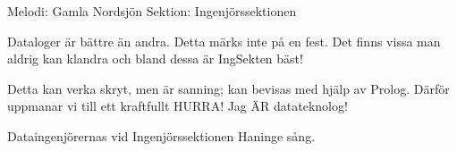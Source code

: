 \begin{song}

\begin{songmeta}
Melodi: Gamla Nordsjön
Sektion: Ingenjörssektionen
\end{songmeta}

\begin{songtext}
Dataloger är bättre än andra.
Detta märks inte på en fest.
Det finns vissa man aldrig kan klandra
och bland dessa är IngSekten bäst!

Detta kan verka skryt, men är sanning;
kan bevisas med hjälp av Prolog.
Därför uppmanar vi till ett kraftfullt HURRA!
Jag ÄR datateknolog!
\end{songtext}

\begin{songnotes}
Dataingenjörernas vid Ingenjörssektionen Haninge sång.
\end{songnotes}
\end{song}
